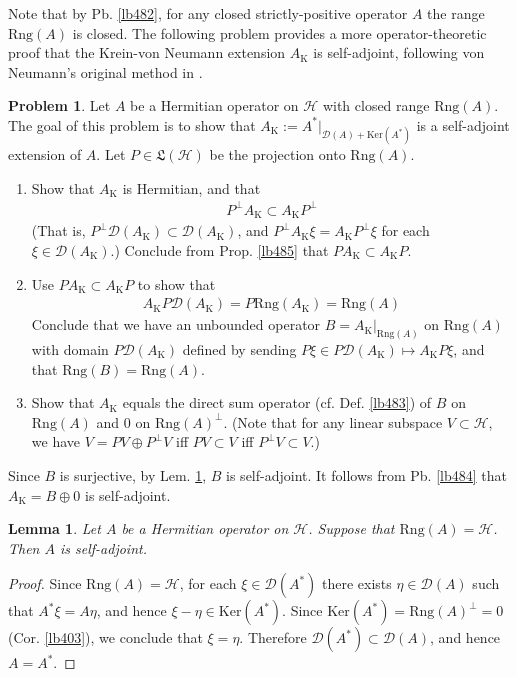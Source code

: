 \documentclass[12pt,b5paper,notitlepage]{article}
\theoremstyle{definition}
\newtheorem{prob}{\color{red}Problem}[section]
\theoremstyle{plain}
\newtheorem{lm}[df]{Lemma}
\newcommand{\fk}{\mathfrak}
\newcommand{\Dom}{\mathscr{D}}
\newcommand{\Ker}{\mathrm{Ker}}
\newcommand{\Rng}{\mathrm{Rng}}
\newcommand{\MH}{\mathcal H}
\newcommand{\Krm}{{\mathrm K}}
\numberwithin{equation}{section}
\begin{document}
Note that by Pb. \ref{lb482}, for any closed strictly-positive operator $A$ the range $\Rng(A)$ is closed. The following problem provides a more operator-theoretic proof that the Krein-von Neumann extension $A_\Krm$ is self-adjoint, following von Neumann's original method in \cite{vN29a}.

\begin{prob}
Let $A$ be a Hermitian operator on $\MH$ with closed range $\Rng(A)$. The goal of this problem is to show that $A_\Krm:=A^*|_{\Dom(A)+\Ker(A^*)}$ is a self-adjoint extension of $A$. Let $P\in\fk L(\MH)$ be the projection onto $\Rng(A)$.
\begin{enumerate}
\item  Show that $A_\Krm$ is Hermitian, and that
\begin{align*}
P^\perp A_\Krm\subset A_\Krm P^\perp
\end{align*}
(That is, $P^\perp\Dom(A_\Krm)\subset\Dom(A_\Krm)$, and $P^\perp A_\Krm\xi=A_\Krm P^\perp\xi$ for each $\xi\in\Dom(A_\Krm)$.) Conclude from Prop. \ref{lb485} that $PA_\Krm\subset A_\Krm P$.
\item Use $PA_\Krm\subset A_\Krm P$ to show that
\begin{align*}
A_\Krm P\Dom(A_\Krm)=P\Rng(A_\Krm)=\Rng(A)
\end{align*}
Conclude that we have an unbounded operator $B=A_\Krm|_{\Rng(A)}$ on $\Rng(A)$ with domain $P\Dom(A_\Krm)$ defined by sending $P\xi\in P\Dom(A_\Krm)\mapsto A_\Krm P\xi$, and that $\Rng(B)=\Rng(A)$. 
\item Show that $A_\Krm$ equals the direct sum operator (cf. Def. \ref{lb483}) of $B$ on $\Rng(A)$ and $0$ on $\Rng(A)^\perp$. (Note that for any linear subspace $V\subset \MH$, we have $V=PV\oplus P^\perp V$ iff $PV\subset V$ iff $P^\perp V\subset V$.) 
\end{enumerate}
Since $B$ is surjective, by Lem. \ref{lb486}, $B$ is self-adjoint. It follows from Pb. \ref{lb484} that $A_\Krm=B\oplus 0$ is self-adjoint.
\end{prob}


\begin{lm}\label{lb486}
Let $A$ be a Hermitian operator on $\MH$. Suppose that $\Rng(A)=\MH$. Then $A$ is self-adjoint.
\end{lm}


\begin{proof}
Since $\Rng(A)=\MH$, for each $\xi\in\Dom(A^*)$ there exists $\eta\in\Dom(A)$ such that $A^*\xi=A\eta$, and hence $\xi-\eta\in\Ker(A^*)$. Since $\Ker(A^*)=\Rng(A)^\perp=0$ (Cor. \ref{lb403}), we conclude that $\xi=\eta$. Therefore $\Dom(A^*)\subset\Dom(A)$, and hence $A=A^*$.
\end{proof}
\end{document}
